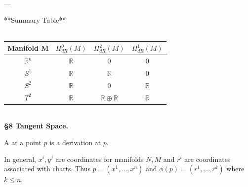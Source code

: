 \documentclass[10pt,a4paper]{report}
\begin{document}
 ---

 **Summary Table**\\ \\
 \begin{tabular}{|c|c|c|c|}
 \hline
  Manifold M & $H^0_{dR}(M)$ & $H^2_{dR}(M)$& $H^1_{dR}(M)$ \\
 \hline
  \( \mathbb{R}^n \) & \( \mathbb{R} \) & 0 & 0 \\
 \hline
 \( S^1 \) & \( \mathbb{R} \) & \( \mathbb{R} \) & 0 \\
 \hline
  \( S^2 \) & \( \mathbb{R} \) & 0 & \( \mathbb{R} \) \\
 \hline
 \( T^2 \) & \( \mathbb{R} \) & \( \mathbb{R} \oplus \mathbb{R} \) & \( \mathbb{R} \)\\
 \hline
 \end{tabular}\\
 
 \newpage
 \textbf{\Large{\S 8 Tangent Space.}}
 
 \setcounter{chapter}{8}
 \setcounter{section}{1}
 
 \begin{definition}  A  at a point $p$ is a derivation at $p$.
 \end{definition}
 
 \begin{remark}
 
 In general, $x^i, y^j$ are coordinates for manifolds $N,M$ and $r^i$ are coordinates associated with charts.  Thus $p=(x^1, \dots, x^n)$ and $\phi(p)=(r^1, \dots, r^k)$ where $k \le n$.
 \end{remark}
 
\end{document}
